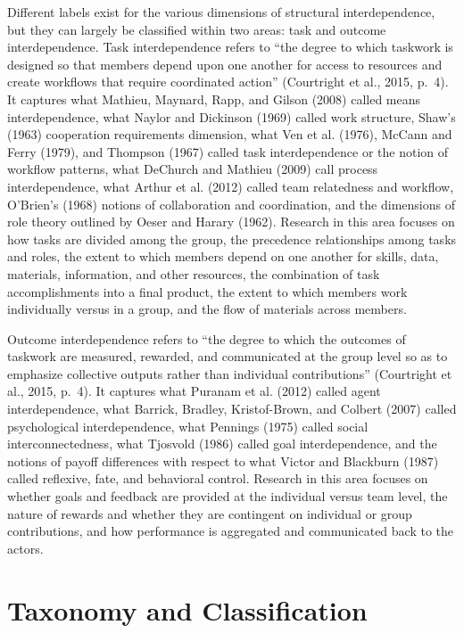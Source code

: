 \documentclass[english,,man]{apa6}
\theoremstyle{definition}
\theoremstyle{definition}
\theoremstyle{definition}
\theoremstyle{remark}
\begin{document}
Different labels exist for the various dimensions of structural
interdependence, but they can largely be classified within two areas:
task and outcome interdependence. Task interdependence refers to
\enquote{the degree to which taskwork is designed so that members depend
upon one another for access to resources and create workflows that
require coordinated action} (Courtright et al., 2015, p.~4). It captures
what Mathieu, Maynard, Rapp, and Gilson (2008) called means
interdependence, what Naylor and Dickinson (1969) called work structure,
Shaw's (1963) cooperation requirements dimension, what Ven et al.
(1976), McCann and Ferry (1979), and Thompson (1967) called task
interdependence or the notion of workflow patterns, what DeChurch and
Mathieu (2009) call process interdependence, what Arthur et al. (2012)
called team relatedness and workflow, O'Brien's (1968) notions of
collaboration and coordination, and the dimensions of role theory
outlined by Oeser and Harary (1962). Research in this area focuses on
how tasks are divided among the group, the precedence relationships
among tasks and roles, the extent to which members depend on one another
for skills, data, materials, information, and other resources, the
combination of task accomplishments into a final product, the extent to
which members work individually versus in a group, and the flow of
materials across members.

Outcome interdependence refers to \enquote{the degree to which the
outcomes of taskwork are measured, rewarded, and communicated at the
group level so as to emphasize collective outputs rather than individual
contributions} (Courtright et al., 2015, p.~4). It captures what Puranam
et al. (2012) called agent interdependence, what Barrick, Bradley,
Kristof-Brown, and Colbert (2007) called psychological interdependence,
what Pennings (1975) called social interconnectedness, what Tjosvold
(1986) called goal interdependence, and the notions of payoff
differences with respect to what Victor and Blackburn (1987) called
reflexive, fate, and behavioral control. Research in this area focuses
on whether goals and feedback are provided at the individual versus team
level, the nature of rewards and whether they are contingent on
individual or group contributions, and how performance is aggregated and
communicated back to the actors.

\hypertarget{taxonomy-and-classification}{%
\section{Taxonomy and
Classification}\label{taxonomy-and-classification}}
\end{document}
